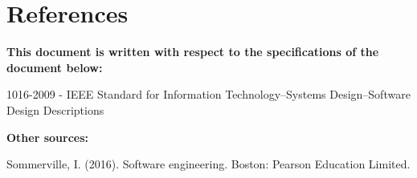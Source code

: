 \documentclass[11pt]{article}
\begin{document}
\section{References}


\textbf{This document is written with respect to the specifications of the document below:\\}

1016-2009 - IEEE Standard for Information Technology--Systems Design--Software Design Descriptions\\

\begin{flushleft}
    \textbf{Other sources:\\}

\end{flushleft}

 Sommerville, I. (2016). Software engineering. Boston: Pearson Education Limited.
\end{document}
